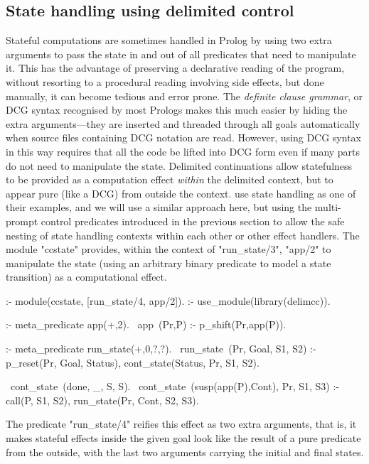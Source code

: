 \subsection{State handling using delimited control}
\label{sec:ccstate}

Stateful computations are sometimes handled in Prolog by using two extra arguments to pass the state in and out
of all predicates that need to manipulate it. This has the advantage of preserving a  
declarative reading of the program, without resorting to a procedural reading involving side effects, but done 
manually, it can become tedious and
error prone. The \emph{definite clause grammar}, or DCG syntax \cite{PereiraWarren1980}
recognised by most Prologs makes this much easier by hiding the extra arguments---they are inserted and
threaded through all goals automatically when source files containing DCG notation
are read. However, using DCG syntax in this way requires that all the code be lifted into DCG form
even if many parts do not need to manipulate the state. Delimited continuations allow statefulness
to be provided as a computation effect \emph{within} the delimited context, but to appear pure
(like a DCG) from outside the context. \cite{SchrijversDemoenDesouter2013} use state handling
as one of their examples, and we will use a similar approach here, but using the multi-prompt
control predicates introduced in the previous section to allow the safe nesting of state handling
contexts within each other or other effect handlers. The module "ccstate" provides,
within the context of "run_state/3", "app/2" to manipulate the state (using an arbitrary binary predicate
to model a state transition) as a computational effect.
\begin{prolog-framed}[name=ccstate]
  :- module(ccstate, [run_state/4, app/2]).
  :- use_module(library(delimcc)).

  :- meta_predicate app(+,2).
  ~app~(Pr,P)  :- p_shift(Pr,app(P)).

  :- meta_predicate run_state(+,0,?,?).
  ~run_state~(Pr, Goal, S1, S2) :- 
     p_reset(Pr, Goal, Status), 
     cont_state(Status, Pr, S1, S2).

  ~cont_state~(done, _, S, S).
  ~cont_state~(susp(app(P),Cont), Pr, S1, S3) :- 
    call(P, S1, S2), 
    run_state(Pr, Cont, S2, S3).
\end{prolog-framed}
The predicate "run_state/4" reifies this effect
as two extra arguments, that is, it makes stateful effects inside the given goal look like the result
of a pure predicate from the outside, with the last two arguments carrying the initial and final
states.

